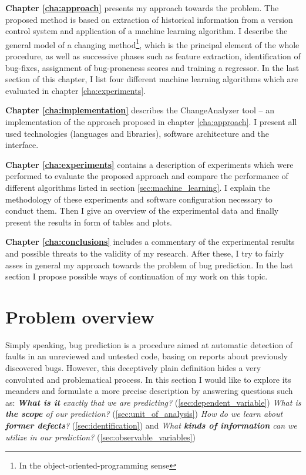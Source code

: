 \documentclass{pracamgr}
\begin{document}
\medskip \noindent
\textbf{Chapter \ref{cha:approach}} presents my approach towards the problem. The proposed method is based on extraction of historical information from a version control system and application of a machine learning algorithm. I describe the general model of a changing method\footnote{In the object-oriented-programming sense}, which is the principal element of the whole procedure, as well as successive phases such as feature extraction, identification of bug-fixes, assignment of bug-proneness scores and training a regressor. In the last section of this chapter, I list four different machine learning algorithms which are evaluated in chapter \ref{cha:experiments}.

\medskip \noindent
\textbf{Chapter \ref{cha:implementation}} describes the ChangeAnalyzer tool -- an implementation of the approach proposed in chapter \ref{cha:approach}. I present all used technologies (languages and libraries), software architecture and the interface.

\medskip \noindent
\textbf{Chapter \ref{cha:experiments}} contains a description of experiments which were performed to evaluate the proposed approach and compare the performance of different algorithms listed in section \ref{sec:machine_learning}. I explain the methodology of these experiments and software configuration necessary to conduct them. Then I give an overview of the experimental data and finally present the results in form of tables and plots.

\medskip \noindent
\textbf{Chapter \ref{cha:conclusions}} includes a commentary of the experimental results and possible threats to the validity of my research. After these, I try to fairly asses in general my approach towards the problem of bug prediction. In the last section I propose possible ways of continuation of my work on this topic.

\chapter{Problem overview}
\label{cha:overview}
Simply speaking, bug prediction is a procedure aimed at automatic detection of faults in an unreviewed and untested code, basing on reports about previously discovered bugs. However, this deceptively plain definition hides a very convoluted and problematical process. In this section I would like to explore its meanders and formulate a more precise description by answering questions such as: \emph{\textbf{What is it} exactly that we are predicting?} (\ref{sec:dependent_variable}) \emph{What is \textbf{the scope} of our prediction?} (\ref{sec:unit_of_analysis}) \emph{How do we learn about \textbf{former defects}?} (\ref{sec:identification}) and \emph{What \textbf{kinds of information} can we utilize in our prediction?} (\ref{sec:observable_variables})
\end{document}
